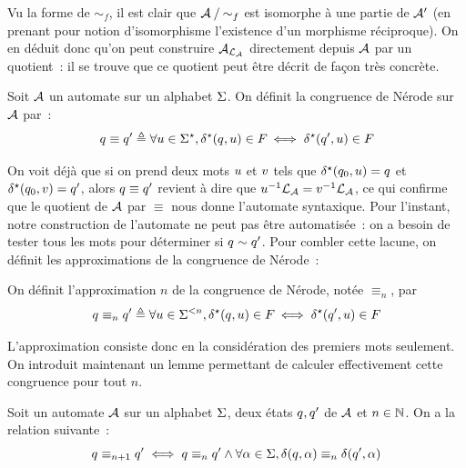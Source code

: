 Vu la forme de $\sim_f$, il est clair que $\mathord{\mathcal{A}}\mathbin{/}\mathord{\sim_f}$ est isomorphe
à une partie de $\mathcal{A}'$ (en prenant pour notion d'isomorphisme l'existence
d'un morphisme réciproque). On en déduit donc qu'on peut construire
$\mathcal{A}_{\mathcal L_{\mathcal{A}}}$ directement depuis $\mathcal{A}$ par un quotient~: il se
trouve que ce quotient peut être décrit de façon très concrète.

\begin{definition}
  Soit $\mathcal{A}$ un automate sur un alphabet $\Sigma$. On définit la congruence de
  Nérode sur $\mathcal{A}$ par~:
  \[q_{} \equiv q_{}' \triangleq \forall u \in \Sigma^{\star},
  \delta_{}^{\star}(q_{},u) \in F_{} \iff \delta_{}^{\star}(q_{}',u) \in F_{}\]
\end{definition}

On voit déjà que si on prend deux mots $u$ et $v$ tels que
$\delta_{}^{\star}(q_{0},u)=q_{}$ et $\delta_{}^{\star}(q_{0},v) = q_{}'$, alors
$q_{} \equiv q_{}'$ revient à dire que
$u^{-1}\mathcal L_{\mathcal{A}}= v^{-1}\mathcal L_{\mathcal{A}}$, ce qui
confirme que le quotient de $\mathcal{A}$ par $\equiv$ nous donne l'automate
syntaxique. Pour l'instant, notre construction de l'automate ne peut pas être
automatisée~: on a besoin de tester tous les mots pour déterminer si
$q_{}\sim q_{}'$. Pour combler cette lacune, on définit les approximations de
la congruence de Nérode~:

\begin{definition}
  On définit l'approximation $n$ de la congruence de Nérode, notée $\equiv_n$,
  par
  \[q_{}\equiv_n q_{}' \triangleq \forall u \in \Sigma^{<n},
  \delta_{}^{\star}(q_{},u)\in F_{} \iff \delta_{}^{\star}(q_{}',u) \in F_{}\]
\end{definition}

L'approximation consiste donc en la considération des premiers mots seulement.
On introduit maintenant un lemme permettant de calculer effectivement cette
congruence pour tout $n$.

\begin{lemma}\label{lem.nerode.succ}
  Soit un automate $\mathcal{A}$ sur un alphabet $\Sigma$, deux états $q_{},q_{}'$
  de $\mathcal{A}$ et $n \in \mathbb N$. On a la relation suivante~:
  \[q_{} \equiv_{n+1} q_{}' \iff q_{}\equiv_n q_{}' \land
  \forall \alpha \in \Sigma,
  \delta_{}(q_{},\alpha)\equiv_n \delta_{}(q_{}',\alpha)\]
\end{lemma}

